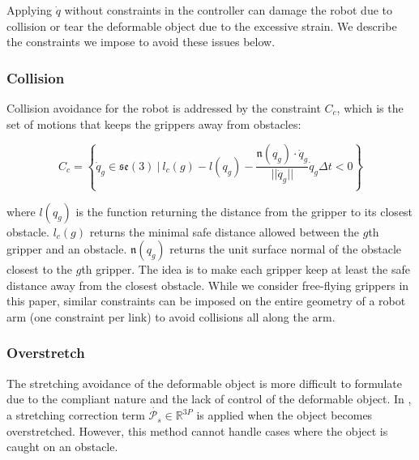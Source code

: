 Applying $\dot{q}$ without constraints in the controller can damage the robot due to  collision or tear the deformable object due to the excessive strain. We describe the constraints we impose to avoid these issues below.

\subsubsection{Collision} Collision avoidance for the robot is addressed by the constraint $C_c$, which is the set of motions that keeps the grippers away from obstacles:

\begin{equation}
C_c = \left\{\dot{q}_g\in \mathfrak{se}(3)\: |\:  l_c(g) - l(q_g) - \frac{\mathfrak{n}(q_g) \cdot \dot{q}_g}{||\dot{q}_g||} \dot{q}_g \Delta t < 0\right\}
\label{Eq: Collision_constraint_Method}
\end{equation}


\noindent where $l(q_g)$ is the function returning the distance from the gripper to its closest obstacle. 
$l_c(g)$ returns the minimal safe distance allowed between the $g$th gripper and an obstacle. 
$\mathfrak{n}(q_g)$ returns the unit surface normal of the obstacle closest to the $g$th gripper. 
The idea is to make each gripper keep at least the safe distance away from the closest obstacle. While we consider free-flying grippers in this paper, similar constraints can be imposed on the entire geometry of a robot arm (one constraint per link) to avoid collisions all along the arm.  

\subsubsection{Overstretch} \label{Method_Overstretch}
The stretching avoidance of the deformable object is more difficult to formulate due to the compliant nature and the lack of control of the deformable object. In \cite{Berenson2013}, a stretching correction term $\dot{\mathcal{P}_s} \in \mathbb{R}^{3P}$ is applied when the object becomes overstretched. However, this method cannot handle cases where the object is caught on an obstacle.


